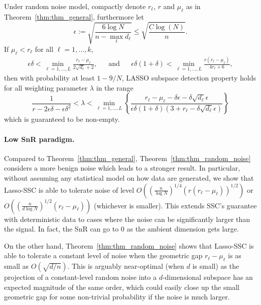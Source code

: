 \documentclass{ctexart}
\begin{document}
\begin{theorem}\label{thm:thm_random_noise}
 Under random noise model, compactly denote $r_{\ell}$, $r$ and $\mu_{\ell}$ as in Theorem~\ref{thm:thm_general}, furthermore let
$$\epsilon := \sqrt{\frac{6\log N}{n-\max_{\ell}{d_{\ell}}}}\leq \sqrt{\frac{C\log(N)}{n}}.$$
 If $\mu_{\ell}<r_{\ell}$ for all $\ell = 1,...,k$,
 \begin{align*}
 \epsilon\delta<\min_{\ell=1,...,L}\frac{r_{\ell}-\mu_{\ell}}{2\sqrt{d_{\ell}}+2}, &&\text{and}&& \epsilon\delta(1+\delta) < \min_{\ell=1,...,L}\frac{r(r_\ell-\mu_\ell)}{4r_\ell+6},
\end{align*}
then with probability at least $1-9/N$, LASSO subspace detection property holds for all weighting parameter $\lambda$ in the range
\begin{equation}\label{eq:thm_rand_noise_lambda_range}
\frac{1}{r- 2\epsilon \delta-\epsilon\delta^2}<
        \lambda<\min_{\ell=1,...,L}\left\{\frac{r_{\ell}-\mu_{\ell}-\delta\epsilon - \delta \sqrt{d_{\ell}} \epsilon}{\epsilon\delta(1+\delta)(3+r_{\ell}-\delta\sqrt{d_{\ell}}\epsilon)}\right\}
\end{equation}
which is guaranteed to be non-empty.
\end{theorem}
\paragraph{Low SnR paradigm.} Compared to Theorem~\ref{thm:thm_general}, Theorem~\ref{thm:thm_random_noise} considers a more benign noise which leads to a stronger result. In particular, without assuming any statistical model on how data are generated, we show that Lasso-SSC is able to tolerate noise of level $O\left((\frac{n}{\log N})^{1/4}(r(r_\ell-\mu_\ell))^{1/2}\right)$ or $O\left((\frac{n}{d\log N})^{1/2}(r_\ell-\mu_\ell)\right)$ (whichever is smaller). This extends SSC's guarantee with deterministic data to cases where the noise can be significantly larger than the signal. In fact, the SnR can go to $0$ as the ambient dimension gets large.

On the other hand, Theorem~\ref{thm:thm_random_noise} shows that Lasso-SSC is able to tolerate a constant level of noise when the geometric gap $r_\ell-\mu_\ell$ is as small as $O(\sqrt{d/n})$. This is arguably near-optimal (when $d$ is small) as the projection of a constant-level random noise into a $d$-dimensional subspace has an expected magnitude of the same order, which could easily close up the small geometric gap for some non-trivial probability if the noise is much larger.
\end{document}
